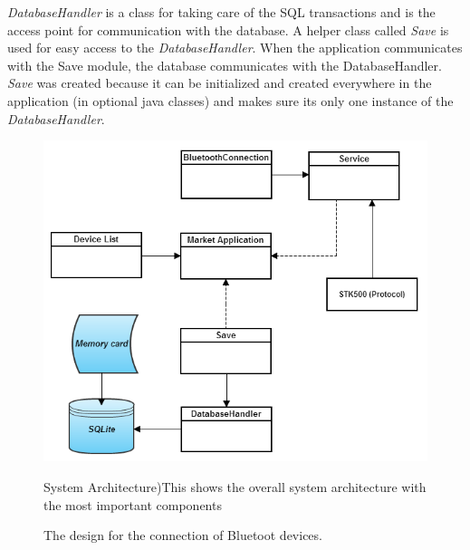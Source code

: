 	\textit{DatabaseHandler} is a class for taking care of the SQL transactions and is the access point for communication with the database. A helper class called \textit{Save} is used for easy access to the \textit{DatabaseHandler}.
	When the application communicates with the Save module, the database communicates with the DatabaseHandler.
	\textit{Save} was created because it can be initialized and created everywhere in the application (in optional java classes) and makes sure its only one instance of the \textit{DatabaseHandler}.



	\begin{figure}[H]
	\centering
	\includegraphics[scale=0.8]{images/System_architecture.png}
	\caption(System Architecture){This shows the overall system architecture with the most important components}
	\label{fig:systemarchitecture}
	\caption{The design for the connection of Bluetoot devices.}
	\label{BTConnection}
	\end{figure}


